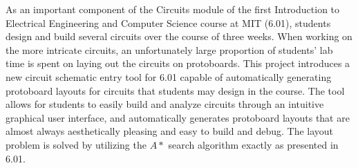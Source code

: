 % 
% 
%

As an important component of the Circuits module of the first Introduction to
Electrical Engineering and Computer Science course at MIT (6.01), students
design and
build several circuits over the course of three weeks. When working on the
more intricate circuits, an unfortunately large proportion of students' lab time
is spent on laying out the circuits on protoboards. This project introduces a
new circuit schematic entry tool for 6.01 capable of automatically generating
protoboard layouts for circuits that students may design in the course. The tool
allows for students to easily build and analyze circuits through an intuitive
graphical user interface, and automatically generates protoboard layouts that
are almost always aesthetically pleasing and easy to build and debug.
The layout problem is solved by utilizing the $A*$ search algorithm exactly as
presented in 6.01.
